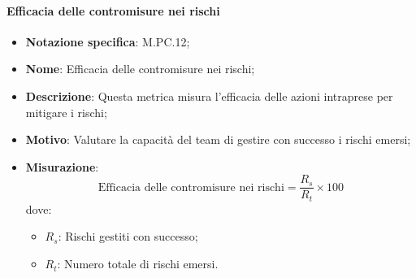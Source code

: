 \paragraph*{Efficacia delle contromisure nei rischi}
\begin{itemize}
    \item \textbf{Notazione specifica}: M.PC.12;
    \item \textbf{Nome}: Efficacia delle contromisure nei rischi;
    \item \textbf{Descrizione}: Questa metrica misura l'efficacia delle azioni intraprese per mitigare i rischi;
    \item \textbf{Motivo}: Valutare la capacità del team di gestire con successo i rischi emersi;
    \item \textbf{Misurazione}:
    \[
        \text{Efficacia delle contromisure nei rischi} = \frac{R_s}{R_t} \times 100
    \]
    dove:
    \begin{itemize}
        \item $R_{s}$: Rischi gestiti con successo;
        \item $R_{t}$: Numero totale di rischi emersi.
    \end{itemize}
\end{itemize}